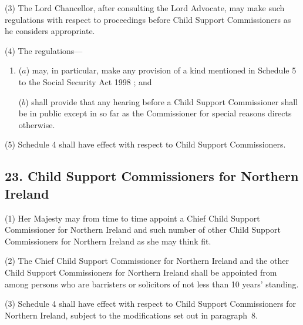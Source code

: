 \documentclass[12pt,a4paper]{article}
\begin{document}
(3) The Lord Chancellor, after consulting the Lord Advocate, may make such regulations with respect to proceedings before Child Support Commissioners as he considers appropriate.

(4) The regulations—
\begin{enumerate}\item[]
($a$) may, in particular, make any provision of a kind mentioned in 
Schedule 5 to the Social Security Act 1998%
; and

($b$) shall provide that any hearing before a Child Support Commissioner shall be in public except in so far as the Commissioner for special reasons directs otherwise.
\end{enumerate}

(5) Schedule 4 shall have effect with respect to Child Support Commissioners.


\subsection{23. Child Support Commissioners for Northern Ireland}

(1) Her Majesty may from time to time
 appoint a Chief Child Support Commissioner for Northern Ireland and 
such number of other Child Support Commissioners for Northern Ireland as she may think fit.

(2) The Chief Child Support Commissioner for Northern Ireland and the other Child Support Commissioners for Northern Ireland shall be appointed from among persons who are barristers or solicitors of not less than 10 years' standing.

(3) Schedule 4 shall have effect with respect to Child Support Commissioners for Northern Ireland, subject to the modifications set out in paragraph~8.

%
\end{document}
